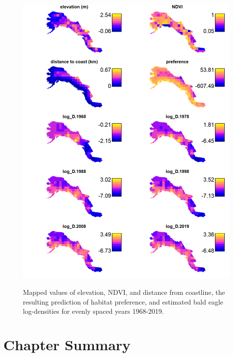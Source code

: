 \begin{figure}[!ht]
    \caption[Mapped preference and range recovery for bald eagles]{Mapped values of elevation, NDVI, and distance from coastline, the resulting prediction of habitat preference, and estimated bald eagle log-densities for evenly spaced years 1968-2019.}
    \includegraphics[width=5.5in]{Chap_10/Eagle_results.png}
    \label{fig:Chap10_eagle_results}
\end{figure}

\section{Chapter Summary}

